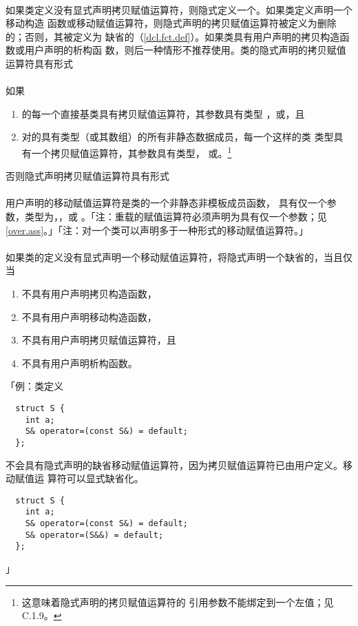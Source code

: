 \paragraph{}
如果类定义没有显式声明拷贝赋值运算符，则隐式定义一个。如果类定义声明一个移动构造
函数或移动赋值运算符，则隐式声明的拷贝赋值运算符被定义为删除的；否则，其被定义为
缺省的（\ref{dcl.fct.def}）。如果类具有用户声明的拷贝构造函数或用户声明的析构函
数，则后一种情形不推荐使用。类的隐式声明的拷贝赋值运算符具有形式        \\
\mbox{}                               \\
如果
\begin{enumerate}
  \item{的每一个直接基类具有拷贝赋值运算符，其参数具有类型
    ，或，且}
  \item{对的具有类型（或其数组）的所有非静态数据成员，每一个这样的类
    类型具有一个拷贝赋值运算符，其参数具有类型，
  或。\footnote{这意味着隐式声明的拷贝赋值运算符的
    引用参数不能绑定到一个左值；见C.1.9。}}
\end{enumerate}
否则隐式声明拷贝赋值运算符具有形式                                            \\
\mbox{}

\paragraph{}
用户声明的移动赋值运算符是类的一个非静态非模板成员函数，
具有仅一个参数，类型为，，或
。「注：重载的赋值运算符必须声明为具有仅一个参数；见
\ref{over.ass}。」「注：对一个类可以声明多于一种形式的移动赋值运算符。」

\paragraph{}
如果类的定义没有显式声明一个移动赋值运算符，将隐式声明一个缺省的，当且仅当
\begin{enumerate}
  \item{不具有用户声明拷贝构造函数，}
  \item{不具有用户声明移动构造函数，}
  \item{不具有用户声明拷贝赋值运算符，且}
  \item{不具有用户声明析构函数。}
\end{enumerate}
「例：类定义
\begin{lstlisting}
  struct S {
    int a;
    S& operator=(const S&) = default;
  };
\end{lstlisting}
不会具有隐式声明的缺省移动赋值运算符，因为拷贝赋值运算符已由用户定义。移动赋值运
算符可以显式缺省化。
\begin{lstlisting}
  struct S {
    int a;
    S& operator=(const S&) = default;
    S& operator=(S&&) = default;
  };
\end{lstlisting}」

